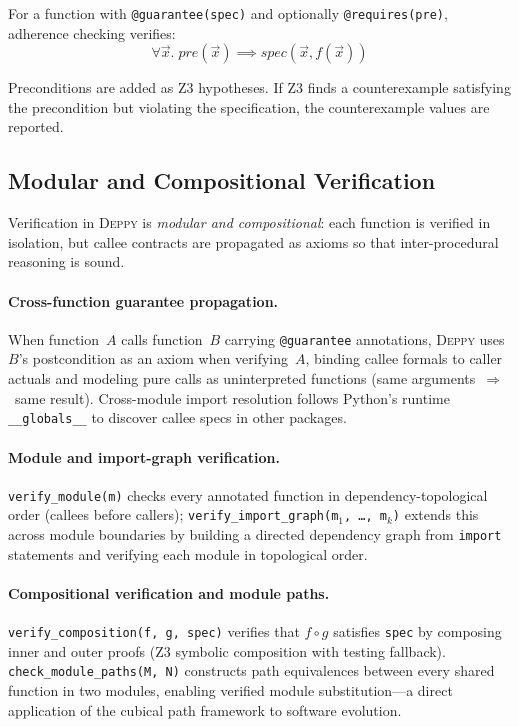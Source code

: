 \documentclass[acmsmall,nonacm,screen]{acmart}
\newcommand{\deppy}{\textsc{Deppy}}
\begin{document}
For a function with \texttt{@guarantee(spec)} and optionally
\texttt{@requires(pre)}, adherence checking verifies:
\[
  \forall \vec{x}.\; \mathit{pre}(\vec{x}) \implies
  \mathit{spec}(\vec{x}, f(\vec{x}))
\]

Preconditions are added as Z3 hypotheses.  If Z3 finds a
counterexample satisfying the precondition but violating the
specification, the counterexample values are reported.

\subsection{Modular and Compositional Verification}\label{sec:modular}

Verification in \deppy{} is \emph{modular and compositional}: each
function is verified in isolation, but callee contracts are propagated
as axioms so that inter-procedural reasoning is sound.

\paragraph{Cross-function guarantee propagation.}
When function~$A$ calls function~$B$ carrying \texttt{@guarantee}
annotations, \deppy{} uses $B$'s postcondition as an axiom when
verifying~$A$, binding callee formals to caller actuals and modeling
pure calls as uninterpreted functions
(same arguments~$\Rightarrow$~same result).
Cross-module import resolution follows Python's runtime
\texttt{\_\_globals\_\_} to discover callee specs in other packages.

\paragraph{Module and import-graph verification.}
\texttt{verify\_module(m)} checks every annotated function in
dependency-topological order (callees before callers);
\texttt{verify\_import\_graph(m$_1$, \ldots, m$_k$)} extends this
across module boundaries by building a directed dependency graph
from \texttt{import} statements and verifying each module in
topological order.

\paragraph{Compositional verification and module paths.}
\texttt{verify\_composition(f, g, spec)} verifies that $f \circ g$
satisfies \texttt{spec} by composing inner and outer proofs
(Z3 symbolic composition with testing fallback).
\texttt{check\_module\_paths(M, N)} constructs path equivalences
between every shared function in two modules, enabling verified
module substitution---a direct application of the cubical path
framework to software evolution.
\end{document}
